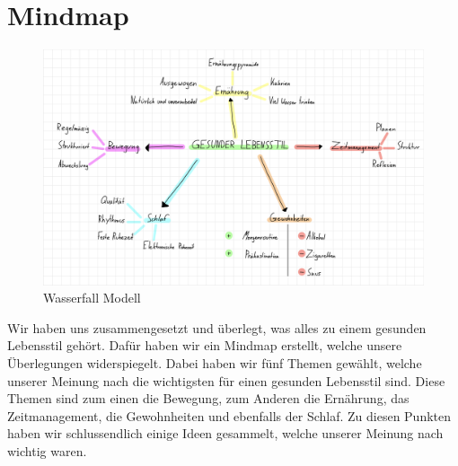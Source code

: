 \chapter{Mindmap}
\chapterauthor{\bastian}
\begin{figure}[!ht]
  \centering
  \includegraphics[width=.9\linewidth]{./images/mindmap.png}
  \caption[Ein von uns digital erstelltes Mindmap]{Wasserfall Modell}
  \label{fig:wasserfall}
\end{figure}
Wir haben uns zusammengesetzt und überlegt, was alles zu einem gesunden Lebensstil gehört.
\newline
Dafür haben wir ein Mindmap erstellt, welche unsere Überlegungen widerspiegelt. Dabei haben wir fünf Themen gewählt, welche unserer Meinung nach die wichtigsten für einen gesunden Lebensstil sind. Diese Themen sind zum einen die Bewegung, zum Anderen die Ernährung, das Zeitmanagement, die Gewohnheiten und ebenfalls der Schlaf.
\newline
Zu diesen Punkten haben wir schlussendlich einige Ideen gesammelt, welche unserer Meinung nach wichtig waren.
